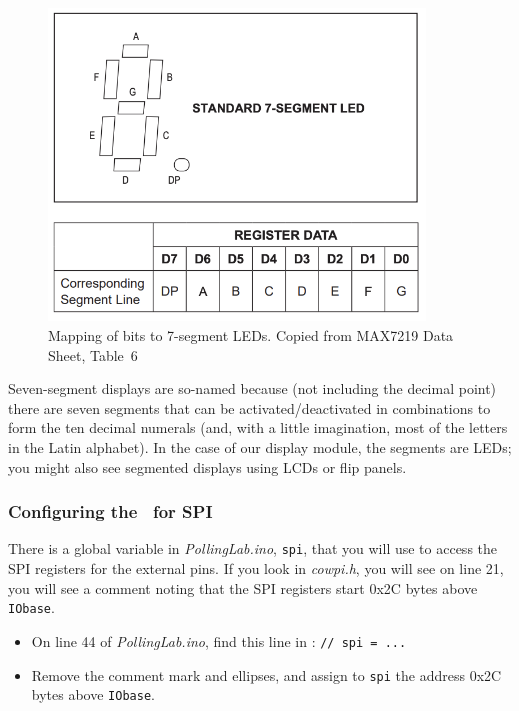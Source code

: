 \begin{figure}
    \centering
    \includegraphics[width=10cm]{SevenSegment}
    \caption{Mapping of bits to 7-segment LEDs. \tiny Copied from MAX7219 Data Sheet, Table~6 \label{fig:SevenSegment}}
\end{figure}

Seven-segment displays are so-named because (not including the decimal point)
there are seven segments that can be activated/deactivated in combinations to
form the ten decimal numerals (and, with a little imagination, most of the
letters in the Latin alphabet). In the case of our display module, the segments
are LEDs; you might also see segmented displays using LCDs or flip panels.

\subsubsection{Configuring the \nano\ for SPI}

There is a global variable in \textit{PollingLab.ino},
\lstinline{spi}, that you will use to access the SPI registers for
the external pins. If you look in \textit{cowpi.h}, you will see on line 21,
you will see a comment noting that the SPI registers start 0x2C bytes above
\lstinline{IObase}.

    \begin{itemize}
    \item On line 44 of \textit{PollingLab.ino}, find this line in : \lstinline{// spi = ...}
    \item Remove the comment mark and ellipses, and assign to \lstinline{spi} the address 0x2C bytes above \lstinline{IObase}.
    \end{itemize}


